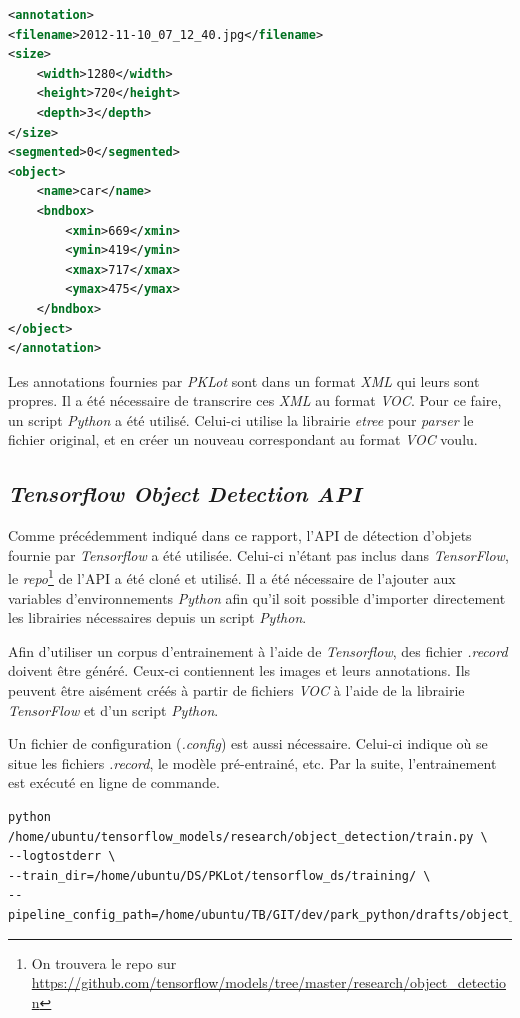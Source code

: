 \begin{lstlisting}[caption={Exemple de fichier \textit{VOC}}, label={lst:voc}, language=XML] 
<annotation>
<filename>2012-11-10_07_12_40.jpg</filename>
<size>
    <width>1280</width>   
    <height>720</height>
    <depth>3</depth>
</size>
<segmented>0</segmented>
<object>
    <name>car</name>
    <bndbox>
        <xmin>669</xmin>
        <ymin>419</ymin>
        <xmax>717</xmax>
        <ymax>475</ymax>
    </bndbox>
</object>
</annotation>
\end{lstlisting}

Les annotations fournies par \textit{PKLot} sont dans un format \textit{XML} qui leurs sont propres. Il a été nécessaire de transcrire ces \textit{XML} au format \textit{VOC}. Pour ce faire, un script \textit{Python} a été utilisé. Celui-ci utilise la librairie \textit{etree} pour \textit{parser} le fichier original, et en créer un nouveau correspondant au format \textit{VOC} voulu. 

\subsection{\textit{Tensorflow Object Detection API}}
Comme précédemment indiqué dans ce rapport, l'API de détection d'objets fournie par \textit{Tensorflow} a été utilisée. Celui-ci n'étant pas inclus dans \textit{TensorFlow}, le \textit{repo}\footnote{On trouvera le repo sur \url{https://github.com/tensorflow/models/tree/master/research/object_detection}} de l'API a été cloné et utilisé. Il a été nécessaire de l'ajouter aux variables d'environnements \textit{Python} afin qu'il soit possible d'importer directement les librairies nécessaires depuis un script \textit{Python}.

Afin d'utiliser un corpus d'entrainement à l'aide de \textit{Tensorflow}, des fichier \textit{.record} doivent être généré. Ceux-ci contiennent les images et leurs annotations. Ils peuvent être aisément créés à partir de fichiers \textit{VOC} à l'aide de la librairie \textit{TensorFlow} et d'un script \textit{Python}. 

Un fichier de configuration (\textit{.config}) est aussi nécessaire. Celui-ci indique où se situe les fichiers \textit{.record}, le modèle pré-entrainé, etc. Par la suite, l'entrainement est exécuté en ligne de commande.

\begin{lstlisting}[caption={Exécution d'un entrainement à l'aide de \textit{Tensorflow Object Detection API}}, label={lst:cmd_train}, numbers=none] 
python /home/ubuntu/tensorflow_models/research/object_detection/train.py \
--logtostderr \
--train_dir=/home/ubuntu/DS/PKLot/tensorflow_ds/training/ \
--pipeline_config_path=/home/ubuntu/TB/GIT/dev/park_python/drafts/object_detection/tensorflow_api_pklot/training.config
\end{lstlisting}

